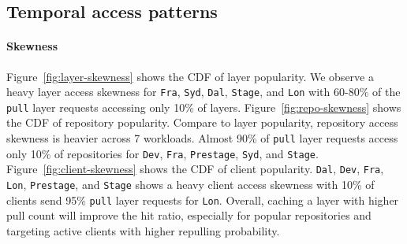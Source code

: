 \subsection{Temporal access patterns}



\paragraph{Skewness}
Figure~\ref{fig:layer-skewness} shows the CDF of layer popularity.
We observe a heavy layer access skewness for \texttt{Fra}, \texttt{Syd}, \texttt{Dal}, \texttt{Stage}, and \texttt{Lon} with 60-80\%  of the \texttt{pull} layer requests accessing only 10\% of layers.
Figure~\ref{fig:repo-skewness} shows the CDF of repository popularity.
Compare to layer popularity, 
repository access skewness is heavier across 7 workloads.
Almost 90\% of \texttt{pull} layer requests access only 10\% of repositories for 
\texttt{Dev}, \texttt{Fra}, \texttt{Prestage}, \texttt{Syd}, and \texttt{Stage}.
Figure~\ref{fig:client-skewness} shows the CDF of client popularity.
\texttt{Dal}, \texttt{Dev}, \texttt{Fra}, \texttt{Lon}, \texttt{Prestage}, and \texttt{Stage} shows a heavy client access skewness with
10\% of clients send 95\% \texttt{pull} layer requests for \texttt{Lon}.
Overall, caching a layer with higher pull count will improve the hit ratio, 
especially for popular repositories and targeting active clients with higher repulling probability.

